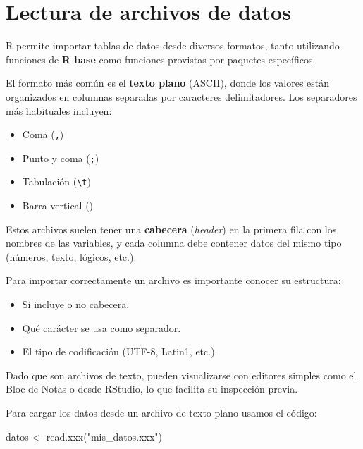 \documentclass[
  spanish,
  letterpaper,
  DIV=11,
  numbers=noendperiod]{scrreprt}
\newenvironment{Shaded}{\begin{snugshade}}{\end{snugshade}}
\newcommand{\FunctionTok}[1]{\textcolor[rgb]{0.28,0.35,0.67}{#1}}
\newcommand{\NormalTok}[1]{\textcolor[rgb]{0.00,0.23,0.31}{#1}}
\newcommand{\OtherTok}[1]{\textcolor[rgb]{0.00,0.23,0.31}{#1}}
\newcommand{\StringTok}[1]{\textcolor[rgb]{0.13,0.47,0.30}{#1}}
\begin{document}
\section{Lectura de archivos de
datos}\label{lectura-de-archivos-de-datos}

R permite importar tablas de datos desde diversos formatos, tanto
utilizando funciones de \textbf{R base} como funciones provistas por
paquetes específicos.

El formato más común es el \textbf{texto plano} (ASCII), donde los
valores están organizados en columnas separadas por caracteres
delimitadores. Los separadores más habituales incluyen:

\begin{itemize}
\item
  Coma (\texttt{,})
\item
  Punto y coma (\texttt{;})
\item
  Tabulación (\texttt{\textbackslash{}t})
\item
  Barra vertical (\texttt{\textbar{}})
\end{itemize}

Estos archivos suelen tener una \textbf{cabecera} (\emph{header}) en la
primera fila con los nombres de las variables, y cada columna debe
contener datos del mismo tipo (números, texto, lógicos, etc.).

Para importar correctamente un archivo es importante conocer su
estructura:

\begin{itemize}
\item
  Si incluye o no cabecera.
\item
  Qué carácter se usa como separador.
\item
  El tipo de codificación (UTF-8, Latin1, etc.).
\end{itemize}

Dado que son archivos de texto, pueden visualizarse con editores simples
como el Bloc de Notas o desde RStudio, lo que facilita su inspección
previa.

Para cargar los datos desde un archivo de texto plano usamos el código:

\begin{Shaded}
\begin{Highlighting}[]
\NormalTok{datos }\OtherTok{\textless{}{-}} \FunctionTok{read.xxx}\NormalTok{(}\StringTok{"mis\_datos.xxx"}\NormalTok{)}
\end{Highlighting}
\end{Shaded}
\end{document}
